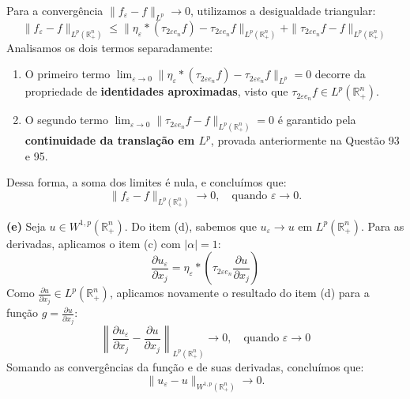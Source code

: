 \documentclass[cs_edp_2026.1.tex]{subfiles} %
\begin{document}
{	Para a convergência $\|f_\varepsilon - f\|_{L^p} \to 0$, utilizamos a desigualdade triangular:
	$$\|f_\varepsilon - f\|_{L^p(\mathbb{R}^n_+)} \le \|\eta_\varepsilon * (\tau_{2\varepsilon e_n} f) - \tau_{2\varepsilon e_n} f\|_{L^p(\mathbb{R}^n_+)} + \|\tau_{2\varepsilon e_n} f - f\|_{L^p(\mathbb{R}^n_+)}$$
	Analisamos os dois termos separadamente:
	\begin{enumerate}
		\item O primeiro termo $\lim_{\varepsilon \to 0} \|\eta_\varepsilon * (\tau_{2\varepsilon e_n} f) - \tau_{2\varepsilon e_n} f\|_{L^p} = 0$ decorre da propriedade de \textbf{identidades aproximadas}, visto que $\tau_{2\varepsilon e_n} f \in L^p(\mathbb{R}^n_+)$.
		\item O segundo termo $\lim_{\varepsilon \to 0} \|\tau_{2\varepsilon e_n} f - f\|_{L^p(\mathbb{R}^n_+)} = 0$ é garantido pela \textbf{continuidade da translação em $L^p$}, provada anteriormente na Questão 93 e 95.
	\end{enumerate}
	Dessa forma, a soma dos limites é nula, e concluímos que:
	$$\boxed{\|f_\varepsilon - f\|_{L^p(\mathbb{R}^n_+)} \to 0, \quad \text{quando } \varepsilon \to 0.}$$
	
	\textbf{(e)} Seja $u \in W^{1,p}(\mathbb{R}^n_+)$. Do item (d), sabemos que $u_\varepsilon \to u$ em $L^p(\mathbb{R}^n_+)$.
	Para as derivadas, aplicamos o item (c) com $|\alpha|=1$:
	$$\frac{\partial u_\varepsilon}{\partial x_j} = \eta_\varepsilon * \left( \tau_{2\varepsilon e_n} \frac{\partial u}{\partial x_j} \right)$$
	Como $\frac{\partial u}{\partial x_j} \in L^p(\mathbb{R}^n_+)$, aplicamos novamente o resultado do item (d) para a função $g = \frac{\partial u}{\partial x_j}$:
	$$\left\| \frac{\partial u_\varepsilon}{\partial x_j} - \frac{\partial u}{\partial x_j} \right\|_{L^p(\mathbb{R}^n_+)} \to 0, \quad \text{quando } \varepsilon \to 0$$
	Somando as convergências da função e de suas derivadas, concluímos que:
	$$\boxed{\|u_\varepsilon - u\|_{W^{1,p}(\mathbb{R}^n_+)} \to 0}.$$
}


\end{document}
